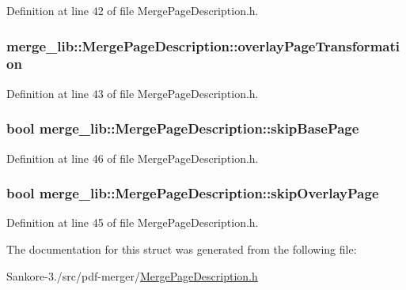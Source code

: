 Definition at line 42 of file Merge\-Page\-Description.\-h.

\hypertarget{structmerge__lib_1_1_merge_page_description_af15089010dfa9f89cdffbae0b99d06f0}{
\subsubsection[{overlay\-Page\-Transformation}]{ merge\-\_\-lib\-::\-Merge\-Page\-Description\-::overlay\-Page\-Transformation}}\label{d0/dff/structmerge__lib_1_1_merge_page_description_af15089010dfa9f89cdffbae0b99d06f0}


Definition at line 43 of file Merge\-Page\-Description.\-h.

\hypertarget{structmerge__lib_1_1_merge_page_description_ab89027ad68337b8244cccd9aa9d9a38c}{
\subsubsection[{skip\-Base\-Page}]{\setlength{\rightskip}{0pt plus 5cm}bool merge\-\_\-lib\-::\-Merge\-Page\-Description\-::skip\-Base\-Page}}\label{d0/dff/structmerge__lib_1_1_merge_page_description_ab89027ad68337b8244cccd9aa9d9a38c}


Definition at line 46 of file Merge\-Page\-Description.\-h.

\hypertarget{structmerge__lib_1_1_merge_page_description_ae09130909c8a12252d4544bfdfea4138}{
\subsubsection[{skip\-Overlay\-Page}]{\setlength{\rightskip}{0pt plus 5cm}bool merge\-\_\-lib\-::\-Merge\-Page\-Description\-::skip\-Overlay\-Page}}\label{d0/dff/structmerge__lib_1_1_merge_page_description_ae09130909c8a12252d4544bfdfea4138}


Definition at line 45 of file Merge\-Page\-Description.\-h.



The documentation for this struct was generated from the following file\-:\begin{DoxyCompactItemize}
\item 
Sankore-\/3./src/pdf-\/merger/\hyperlink{_merge_page_description_8h}{Merge\-Page\-Description.\-h}\end{DoxyCompactItemize}
